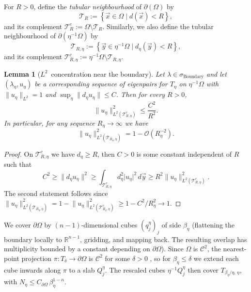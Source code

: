 \documentclass[a4paper,reqno]{amsart}
\numberwithin{equation}{section}
\numberwithin{equation}{section}		%
\numberwithin{figure}{section}			%
\numberwithin{table}{section}				%
\newtheorem{lemma}[theorem]{Lemma}
\theoremstyle{definition}
\newcommand{\<}{\ensuremath \leq}
\renewcommand{\>}{\ensuremath \geq}
\begin{document}
For $R>0$, define the \emph{tubular neighbourhood} of $\partial(\Omega)$ by
\begin{equation}
    \mathcal{T}_{R}:=\left\{\vec{x}\in\Omega\mid d(\vec{x}) < R\right\},
\end{equation}
and its complement $\mathcal{T}_{R}^c:=\Omega\setminus\mathcal{T}_{R}$.
Similarly, we also define the tubular neighbourhood of $\partial(\eta^{-1}\Omega)$ by
\begin{equation}
    \mathcal{T}_{R,\eta}:=\left\{\vec{y}\in\eta^{-1}\Omega\mid d_\eta(\vec{y}) < R\right\},
\end{equation}
and its complement $\mathcal{T}_{R,\eta}^c:=\eta^{-1}\Omega\setminus\mathcal{T}_{R,\eta}$.

\begin{lemma}[$L^2$~concentration near the boundary]\label{lem:L2concentration}
    Let $\lambda\in\sigma_{\text{Boundary}}$ and let $(\lambda_\eta,u_\eta)$ be a corresponding sequence of eigenpairs for $T_\eta$ on $\eta^{-1}\Omega$ with $\lVert u_\eta\rVert_{L^2}=1$ and $\sup_\eta\lVert d_\eta u_\eta\rVert\leq C$. Then for every $R>0$,
    \begin{equation}\label{eq:L2tail}
        \lVert u_\eta\rVert^2_{L^2(\mathcal{T}_{R,\eta}^c)}\leq \frac{C^2}{R^2}.
    \end{equation}
    In particular, for any sequence $R_\eta\rightarrow\infty$ we have
    \begin{equation}
        \lVert u_\eta\rVert^2_{L^2(\mathcal{T}_{R_\eta,\eta})}=1 - \mathcal{O}(R_\eta^{-2}).
    \end{equation}
\end{lemma}
\begin{proof}
    On $\mathcal{T}_{R,\eta}^c$ we have $d_\eta\geq R$, then $C>0$ is some constant independent of $R$ such that
    \begin{equation*}
        C^2 \geq \lVert d_\eta u_\eta\rVert^2 \geq \int_{\mathcal{T}_{R,\eta}^c}d_\eta^2\lvert u_\eta\rvert^2\,d\vec{y} \geq R^2\lVert u_\eta\rVert^2_{L^2(\mathcal{T}_{R,\eta}^c)}.
    \end{equation*}
    The second statement follows since $\lVert u_\eta\rVert^2_{L^2(\mathcal{T}_{R_\eta,\eta})} = 1 - \lVert u_\eta\rVert^2_{L^2(\mathcal{T}_{R_\eta,\eta}^c)} \geq 1 - C^2/R_\eta^2 \rightarrow 1$.
\end{proof}


We cover $\partial\Omega$ by $(n-1)$-dimensional cubes $(q^\eta_j)_j$ of side
$\beta_\eta$ (flattening the boundary locally to $\mathbb{R}^{n-1}$, gridding, and
mapping back. The resulting overlap has multiplicity bounded by a constant depending on $\partial\Omega$).
Since $\Omega$ is $\mathcal{C}^2$, the nearest-point projection $\pi:T_\delta\to\partial\Omega$ is
$\mathcal{C}^2$ for some $\delta>0$ \cite{gilbarg1977elliptic}, so for $\beta_\eta\le\delta$ we extend
each cube inwards along $\pi$ to a slab $Q^\eta_j$. The rescaled cubes $\eta^{-1}Q^\eta_j$
then cover $T_{\beta_\eta/\eta,\,\eta}$, with $N_\eta\le C_{\partial\Omega}\,\beta_\eta^{1-n}$.
\end{document}
